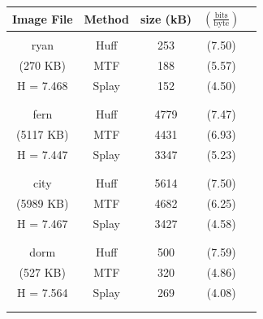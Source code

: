 \documentclass[twoside]{article}
\begin{document}
\begin{multicols}{2}
\begin{center}
\begin{tabular}{ c c c c c }
Image File   & Method & size (kB) & $(\frac{\text{bits}}{\text{byte}})$  \\ \hline \vspace{-0.75em}  \\
ryan        & Huff  & 253 & (7.50) \\
(270 KB)    & MTF   & 188 & (5.57) \\
H = 7.468	& Splay & 152 & (4.50) \\
\vspace{-0.75em} \\ \hline \vspace{-0.75em} \\
fern        & Huff  & 4779 & (7.47) \\
(5117 KB)   & MTF   & 4431 & (6.93) \\
H = 7.447	& Splay & 3347 & (5.23) \\
\vspace{-0.75em} \\ \hline \vspace{-0.75em} \\
city        & Huff  & 5614 & (7.50) \\
(5989 KB)   & MTF   & 4682 & (6.25) \\
H = 7.467	& Splay & 3427 & (4.58) \\
\vspace{-0.75em} \\ \hline \vspace{-0.75em} \\
dorm        & Huff  & 500 & (7.59) \\
(527 KB)    & MTF   & 320 & (4.86) \\
H = 7.564	& Splay & 269 & (4.08) \\
\vspace{-0.75em} \\ \hline \\
\end{tabular}
\end{center}


\end{multicols}
\end{document}
